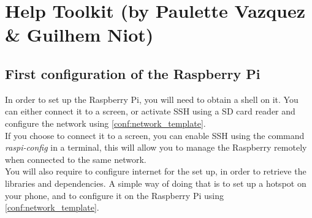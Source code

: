
\chapter{Help Toolkit (by Paulette Vazquez \& Guilhem Niot)}


\section{First configuration of the Raspberry Pi}

In order to set up the Raspberry Pi, you will need to obtain a shell on it. You can either connect it to a screen, or activate SSH using a SD card reader and configure the network using \ref{conf:network_template}. \\
If you choose to connect it to a screen, you can enable SSH using the command \emph{raspi-config} in a terminal, this will allow you to manage the Raspberry remotely when connected to the same network. \\

You will also require to configure internet for the set up, in order to retrieve the libraries and dependencies. A simple way of doing that is to set up a hotspot on your phone, and to configure it on the Raspberry Pi using \ref{conf:network_template}.

